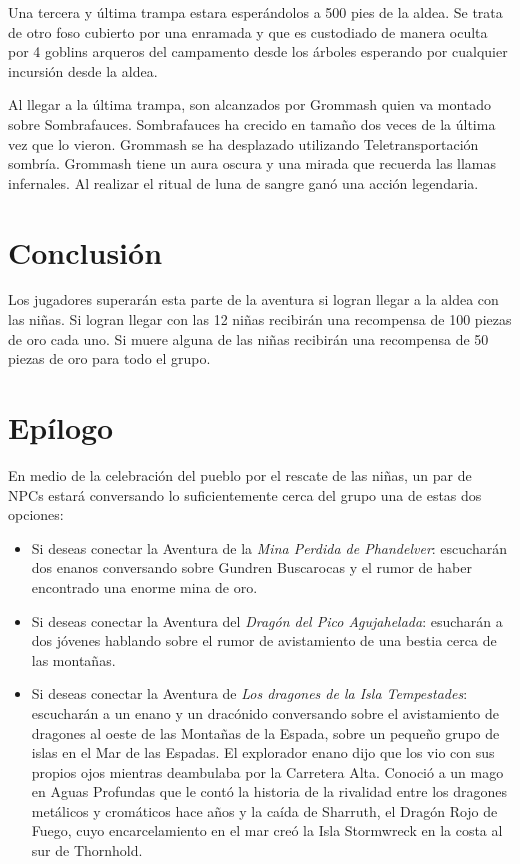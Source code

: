 \documentclass[10pt,twoside,twocolumn,openany]{dndbook}
\begin{document}
Una tercera y última trampa estara esperándolos a 500 pies de la aldea. Se trata de otro foso cubierto
por una enramada y que es custodiado de manera oculta por 4 goblins arqueros del campamento desde los 
árboles esperando por cualquier incursión desde la aldea. 

Al llegar a la última trampa, son alcanzados por Grommash quien va montado sobre Sombrafauces.
Sombrafauces ha crecido en tamaño dos veces de la última vez que lo vieron. Grommash se ha desplazado
utilizando Teletransportación sombría. Grommash tiene un aura oscura y una mirada que recuerda las llamas 
infernales. Al realizar el ritual de luna de sangre ganó una acción legendaria.

\section{Conclusión}

Los jugadores superarán esta parte de la aventura si logran llegar a la aldea con las niñas. Si logran 
llegar con las 12 niñas recibirán una recompensa de 100 piezas de oro cada uno. Si muere alguna de las 
niñas recibirán una recompensa de 50 piezas de oro para todo el grupo.

\section{Epílogo}

En medio de la celebración del pueblo por el rescate de las niñas, un par de NPCs estará conversando
lo suficientemente cerca del grupo una de estas dos opciones:

\begin{itemize}
  \item Si deseas conectar la Aventura de la \emph{Mina Perdida de Phandelver}: escucharán dos 
  enanos conversando sobre Gundren Buscarocas y el rumor de haber encontrado una enorme mina de 
  oro.
  \item Si deseas conectar la Aventura del \emph{Dragón del Pico Agujahelada}: esucharán a dos 
  jóvenes hablando sobre el rumor de avistamiento de una bestia cerca de las montañas.
  \item Si deseas conectar la Aventura de \emph{Los dragones de la Isla Tempestades}: escucharán 
  a un enano y un dracónido conversando sobre el avistamiento de dragones al oeste de las Montañas 
  de la Espada, sobre un pequeño grupo de islas en el Mar de las Espadas. El explorador enano dijo 
  que los vio con sus propios ojos mientras deambulaba por la Carretera Alta. Conoció a un mago en 
  Aguas Profundas que le contó la historia de la rivalidad entre los dragones metálicos y cromáticos hace años y la caída de Sharruth, el Dragón Rojo de Fuego, cuyo encarcelamiento en el mar creó la Isla Stormwreck en la costa al sur de Thornhold.
\end{itemize} 
\end{document}
